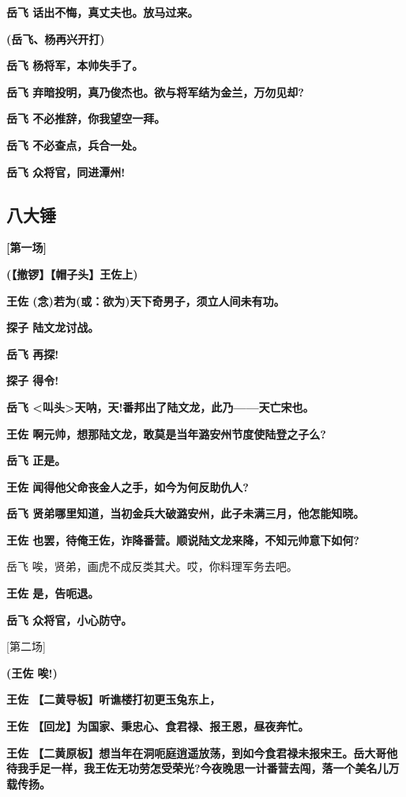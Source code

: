 \textbf{岳飞 话出不悔，真丈夫也。放马过来。}

\textbf{(岳飞、杨再兴开打)}

\textbf{岳飞 杨将军，本帅失手了。}

\textbf{岳飞 弃暗投明，真乃俊杰也。欲与将军结为金兰，万勿见却?}

\textbf{岳飞 不必推辞，你我望空一拜。}

\textbf{岳飞 不必查点，兵合一处。}

\textbf{岳飞 众将官，同进潭州!}

\hypertarget{ux516bux5927ux9524}{%
\subsection{八大锤}\label{ux516bux5927ux9524}}

\textbf{{[}第一场{]}}

\textbf{(【撤锣】【帽子头】王佐上)}

\textbf{王佐 (念)若为(或：欲为)天下奇男子，须立人间未有功。}

\textbf{探子 陆文龙讨战。}

\textbf{岳飞 再探!}

\textbf{探子 得令!}

\textbf{岳飞
\textless{}叫头\textgreater{}天呐，天!番邦出了陆文龙，此乃------天亡宋也。}

\textbf{王佐 啊元帅，想那陆文龙，敢莫是当年潞安州节度使陆登之子么?}

\textbf{岳飞 正是。}

\textbf{王佐 闻得他父命丧金人之手，如今为何反助仇人?}

\textbf{岳飞
贤弟哪里知道，当初金兵大破潞安州，此子未满三月，他怎能知晓。}

\textbf{王佐
也罢，待俺王佐，诈降番营。顺说陆文龙来降，不知元帅意下如何?}

岳飞 唉，贤弟，画虎不成反类其犬。哎，你料理军务去吧。

\textbf{王佐 是，告呃退。}

\textbf{岳飞 众将官，小心防守。}

{[}第二场{]}

\textbf{(王佐 唉!)}

\textbf{王佐 【二黄导板】听谯楼打初更玉兔东上，}

\textbf{王佐 【回龙】为国家、秉忠心、食君禄、报王恩，昼夜奔忙。}

\textbf{王佐
【二黄原板】想当年在洞呃庭逍遥放荡，到如今食君禄未报宋王。岳大哥他待我手足一样，我王佐无功劳怎受荣光?今夜晚思一计番营去闯，落一个美名儿万载传扬。}

